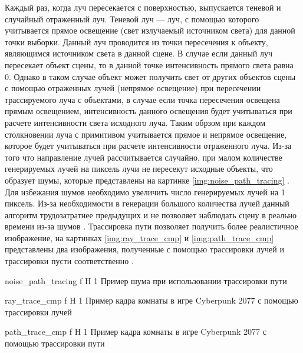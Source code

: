 Каждый раз, когда луч пересекается с поверхностью, выпускается теневой и случайный отраженный луч.
Теневой луч --- луч, с помощью которого учитывается прямое освещение (свет излучаемый источником света) для данной точки выборки. Данный луч проводится из 
точки пересечения к объекту, являющимся источником света в данной сцене. В случае если данный луч пересекает объект сцены, то в данной точке интенсивность
прямого света равна 0. Однако в таком случае объект может получить свет от других объектов сцены с помощью отраженных лучей (непрямое освещение) при пересечении трассируемого луча
с объектами, в случае если  точка пересечения освещена прямым освещением, интенсивность данного освещения будет учитываться при расчете интенсивности света исходного луча.
Таким обрзом при каждом столкновении луча с примитивом учитывается прямое и непрямое освещение, которое будет учитываться при расчете интенсивности отраженного луча.
Из-за того что направление лучей рассчитывается случайно, при малом количестве генерируемых лучей на пиксель лучи не пересекут исходные объекты, что образует шумы, которые 
представлены на картинке \ref{img:noise_path_tracing} \cite{path_tracing, ray_path_tracing}. Для избежания шумов необходимо увеличить число генерируемых лучей на 1 пиксель.
Из-за необходимости в генерации большого количества лучей данный алгоритм трудозатратнее предыдущих и не позволяет наблюдать сцену в реально времени из-за шумов \cite{path_tracing}.
Трассировка пути позволяет получить более реалистичное изображение, на картинках \ref{img:ray_trace_cmp} и \ref{img:path_trace_cmp} представлены два изображения,
полученные с помощью трассировки лучей и трассировки пусти соответственно \cite{cyber_trce}.




{noise_path_tracing} %
{f} %
{H} %
{1\textwidth} %
{Пример шума при использовании трассировки пути} %



{ray_trace_cmp} %
{f} %
{H} %
{1\textwidth} %
{Пример кадра комнаты в игре Cyberpunk 2077 с помощью трассировки лучей} %

{path_trace_cmp} %
{f} %
{H} %
{1\textwidth} %
{Пример кадра комнаты в игре Cyberpunk 2077 с помощью трассировки пути} %







